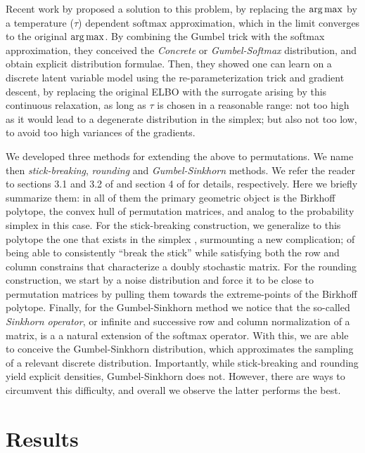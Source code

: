 \documentclass{article}
\begin{document}
Recent work by \citep{Jang2016,Maddison2016} proposed a solution to this problem, by replacing the $\argmax$ by a temperature ($\tau$) dependent $\mathrm{softmax}$ approximation, which in the limit  converges to the original $\argmax$. By combining the Gumbel trick with the softmax approximation, they conceived the \emph{Concrete} or \emph{Gumbel-Softmax} distribution, and obtain explicit distribution formulae. Then, they showed one can learn on a discrete latent variable model using the re-parameterization trick and gradient descent, by replacing the original ELBO with the surrogate arising by this continuous relaxation, as long as $\tau$ is chosen in a reasonable range: not too high as it would lead to a degenerate distribution in the simplex; but also not too low, to avoid too high variances of the gradients.

We developed three methods for extending the above to permutations. We name then \emph{stick-breaking}, \emph{rounding} and \emph{Gumbel-Sinkhorn} methods. We refer the reader to sections 3.1 and 3.2 of  \cite{Linderman2017} and section 4 of \cite{Anonymous2018learning} for details, respectively. Here we briefly summarize them: in all of them the primary geometric object is the Birkhoff polytope, the convex hull of permutation matrices, and analog to the probability simplex in this case. For the stick-breaking construction, we generalize to this polytope the one that exists in the simplex \citep{Linderman2015}, surmounting a new complication; of being able to consistently ``break the stick'' while satisfying both the row and column constrains that characterize a doubly stochastic matrix. For the rounding construction, we start by a noise distribution and force it to be close to permutation matrices by pulling them towards the extreme-points of the Birkhoff polytope. Finally, for the Gumbel-Sinkhorn method we notice that the so-called \emph{Sinkhorn operator}, or infinite and successive row and column normalization of a matrix, is a a natural extension of the softmax operator. With this, we are able to conceive the Gumbel-Sinkhorn distribution, which approximates the sampling of a relevant discrete distribution. Importantly, while stick-breaking and rounding yield explicit densities, Gumbel-Sinkhorn does not. However, there are ways to circumvent this difficulty, and overall we observe the latter performs the best.

\section{Results}
\label{sec:results}
\end{document}
